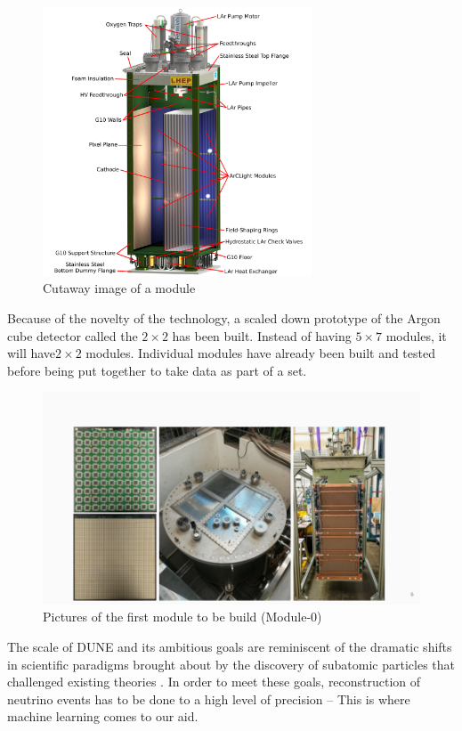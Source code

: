 \begin{figure}[H]
  \centering
  \includegraphics[width=80mm]{figures/ndModule.png}
  \caption{Cutaway image of a module\cite{DUNE_2020b}}
  \label{ndModule}
\end{figure}

Because of the novelty of the technology, a scaled down prototype  of the Argon cube detector called the $2 \times 2$ has been built.
Instead of having $5 \times7$ modules, it will have$2 \times 2$ modules.
Individual modules have already been built and tested before being put together to take data as part of a set.

\begin{figure}[H]
  \centering
  \includegraphics[width=120mm]{figures/ndPic.png}
  \caption{Pictures of the first module to be build (Module-0)}
  \label{ndPic}
\end{figure}

The scale of DUNE and its ambitious goals are reminiscent of the dramatic shifts in scientific paradigms brought about by the discovery of subatomic particles that challenged existing theories \cite{dune_tdr}.
In order to meet these goals, reconstruction of neutrino events has to be done to a high level of precision -- This is where machine learning comes to our aid.





